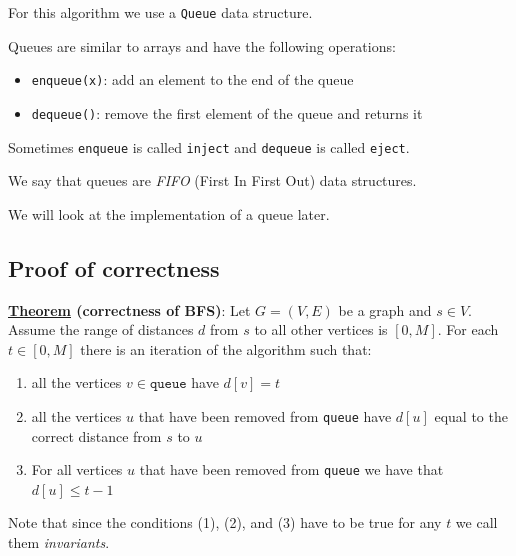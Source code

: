 \documentclass[12pt]{extarticle}
\begin{document}
For this algorithm we use a \texttt{Queue} data structure.

Queues are similar to arrays and have the following operations:
\begin{itemize}
    \item \texttt{enqueue(x)}: add an element to the end of the queue
    \item \texttt{dequeue()}: remove the first element of the queue and returns it
\end{itemize}

Sometimes \texttt{enqueue} is called \texttt{inject} and \texttt{dequeue} is called \texttt{eject}.

We say that queues are \textit{FIFO} (First In First Out) data structures.

We will look at the implementation of a queue later.

\subsection{Proof of correctness}

\textbf{\underline{Theorem} (correctness of BFS)}: Let $G = (V, E)$ be a graph and $s \in V$.
Assume the range of distances $d$ from $s$ to all other vertices is $[0, M]$.
For each $t \in [0, M]$ there is an iteration of the algorithm such that:
\begin{enumerate}
    \item all the vertices $v \in \texttt{queue}$ have $d[v] = t$
    \item all the vertices $u$ that have been removed from \texttt{queue} have $d[u]$ equal to the correct distance from $s$ to $u$
    \item For all vertices $u$ that have been removed from \texttt{queue} we have that $d[u] \leq t - 1$
\end{enumerate}

Note that since the conditions (1), (2), and (3) have to be true for any $t$ we call them \textit{invariants}.
\end{document}

